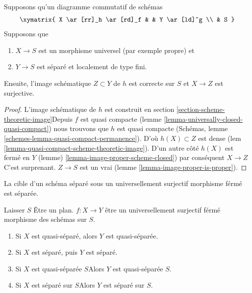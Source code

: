 \begin{lemma}

\label{lemma-scheme-theoretic-image-is-proper}
Supposons qu'un diagramme commutatif de schémas $$
\xymatrix{
X \ar[rr]_h \ar[rd]_f & & Y \ar[ld]^g \\
& S
}
$$ Supposons que
\begin{enumerate}
\item $X \to S$ est un morphisme universel (par exemple propre) et
\item $Y \to S$ est séparé et localement de type fini.
\end{enumerate}
Ensuite, l'image schématique $Z \subset Y$ de $h$ est correcte sur $S$ et $X \to Z$ est surjective.
\end{lemma}

\begin{proof}

L'image schématique de $h$ est construit en section
\ref{section-scheme-theoretic-image}Depuis $f$ est quasi compacte (lemme \ref{lemma-universally-closed-quasi-compact}) nous trouvons que $h$ est quasi compacte (Schémas, lemme \ref{schemes-lemma-quasi-compact-permanence}). D'où $h(X) \subset Z$
est dense (lem \ref{lemma-quasi-compact-scheme-theoretic-image}). D'un autre côté $h(X)$ est fermé en $Y$
(lemme) \ref{lemma-image-proper-scheme-closed}) par conséquent $X \to Z$ C'est surprenant. $Z \to S$ est un vrai (lemme \ref{lemma-image-proper-is-proper}).

\end{proof}

\noindent
La cible d'un schéma séparé sous un universellement surjectif morphisme férmé est séparée.

\begin{lemma}

\label{lemma-image-universally-closed-separated}

Laisser $S$ Être un plan. $f : X \to Y$ être un universellement surjectif férmé morphisme des schémas sur $S$.

\begin{enumerate}

\item Si $X$ est quasi-séparé, alors $Y$ est quasi-séparée.
\item Si $X$ est séparé, puis $Y$ est séparé.
\item Si $X$ est quasi-séparée $S$Alors $Y$ est quasi-séparée $S$.
\item Si $X$ est séparé sur $S$Alors $Y$ est séparé sur $S$.

\end{enumerate}

\end{lemma}

